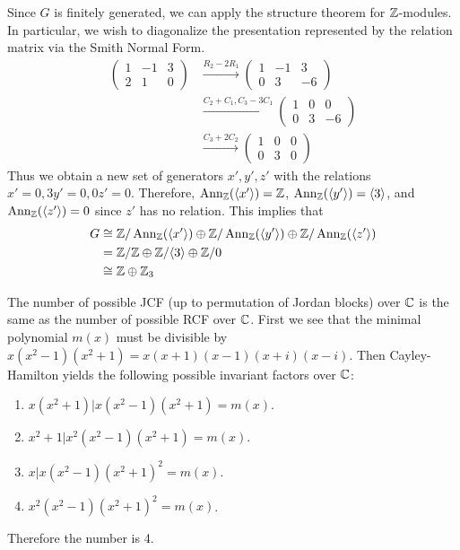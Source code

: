 \documentclass[12pt]{article}
\begin{document}
\begin{problem}[8]
Since $ G$ is finitely generated, we can apply the structure theorem for $ \mathbb{Z}$-modules. In particular, we wish to diagonalize the presentation represented by the relation matrix via the Smith Normal Form.
\begin{align*}
	\begin{pmatrix} 1&-1&3\\2&1&0 \end{pmatrix} & \xrightarrow{ R_2 - 2R_1} \begin{pmatrix} 1&-1&3\\0&3&-6 \end{pmatrix} \\
			 & \xrightarrow{ C_2+ C_1, C_3-3C_1} \begin{pmatrix} 1&0&0\\0&3&-6 \end{pmatrix}  \\
			 & \xrightarrow{ C_3+2C_2} \begin{pmatrix} 1&0&0\\0&3&0 \end{pmatrix}  
\end{align*}
Thus we obtain a new set of generators $ x',y',z'$ with the relations $ x' = 0, 3y'=0,0z'=0$. Therefore, $ \operatorname{Ann}_{ \mathbb{Z}}( \langle x' \rangle) = \mathbb{Z} $, $ \operatorname{Ann}_{ \mathbb{Z}}( \langle y' \rangle) = \langle 3 \rangle$, and $ \operatorname{Ann}_{ \mathbb{Z}}( \langle z' \rangle) =0$ since $ z'$ has no relation. This implies that
\begin{align*}
	G &\cong \mathbb{Z}/ \operatorname{Ann}_{ \mathbb{Z}}( \langle x' \rangle ) \oplus \mathbb{Z} / \operatorname{Ann}_{ \mathbb{Z}}( \langle y' \rangle) \oplus \mathbb{Z} / \operatorname{Ann}_{ \mathbb{Z}}( \langle z' \rangle) \\
	&= \mathbb{Z} / \mathbb{Z} \oplus \mathbb{Z} / \langle 3 \rangle \oplus \mathbb{Z} /0\\
	&\cong \mathbb{Z} \oplus \mathbb{Z}_3
\end{align*}
\end{problem}
\begin{problem}[9]
The number of possible JCF (up to permutation of Jordan blocks) over $ \mathbb{C}$ is the same as the number of possible RCF over $ \mathbb{C}$. First we see that the minimal polynomial $ m(x) $ must be divisible by  $ x(x^2-1)(x^2+1) = x(x+1)(x-1)(x+i)(x-i)$. Then Cayley-Hamilton yields the following possible invariant factors over $ \mathbb{C}$:
\begin{enumerate}[label=(\arabic*)]
	\item $ x(x^2+1)| x(x^2-1)(x^2+1)=m(x)$.
	\item $ x^2+1|x^2(x^2-1)(x^2+1) = m(x)$.
	\item $ x|x(x^2-1)(x^2+1)^2 = m(x)$.
	\item $ x^2(x^2-1)(x^2+1)^2=m(x)$.
\end{enumerate}
Therefore the number is 4.
\end{problem}
\end{document}
